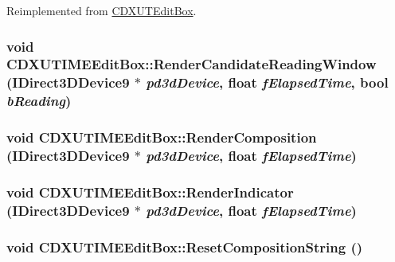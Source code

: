 Reimplemented from \hyperlink{class_c_d_x_u_t_edit_box_af36e6dfc05fb96ee4f60544cc402e760}{CDXUTEditBox}.\hypertarget{class_c_d_x_u_t_i_m_e_edit_box_a86b36b4e056be117ba0a59550edae849}{
\subsubsection[{RenderCandidateReadingWindow}]{\setlength{\rightskip}{0pt plus 5cm}void CDXUTIMEEditBox::RenderCandidateReadingWindow (IDirect3DDevice9 $\ast$ {\em pd3dDevice}, \/  float {\em fElapsedTime}, \/  bool {\em bReading})}}
\label{class_c_d_x_u_t_i_m_e_edit_box_a86b36b4e056be117ba0a59550edae849}
\hypertarget{class_c_d_x_u_t_i_m_e_edit_box_ad8480eedb3123ada70d9b3a702a83c57}{
\subsubsection[{RenderComposition}]{\setlength{\rightskip}{0pt plus 5cm}void CDXUTIMEEditBox::RenderComposition (IDirect3DDevice9 $\ast$ {\em pd3dDevice}, \/  float {\em fElapsedTime})}}
\label{class_c_d_x_u_t_i_m_e_edit_box_ad8480eedb3123ada70d9b3a702a83c57}
\hypertarget{class_c_d_x_u_t_i_m_e_edit_box_a02bbb85b3dd6c19cf6bb2312c8ee4595}{
\subsubsection[{RenderIndicator}]{\setlength{\rightskip}{0pt plus 5cm}void CDXUTIMEEditBox::RenderIndicator (IDirect3DDevice9 $\ast$ {\em pd3dDevice}, \/  float {\em fElapsedTime})}}
\label{class_c_d_x_u_t_i_m_e_edit_box_a02bbb85b3dd6c19cf6bb2312c8ee4595}
\hypertarget{class_c_d_x_u_t_i_m_e_edit_box_aaf6fd90a9cd492f6194bb0a8053fbcc3}{
\subsubsection[{ResetCompositionString}]{\setlength{\rightskip}{0pt plus 5cm}void CDXUTIMEEditBox::ResetCompositionString ()}}

